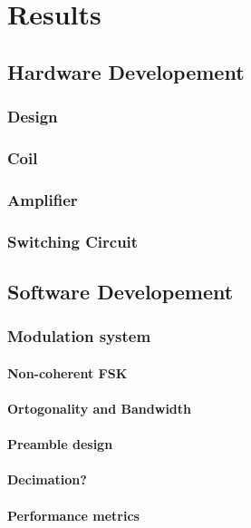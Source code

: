 \chapter{Results}\label{ch:results}

\section{Hardware Developement}

\subsection{Design}
\subsection{Coil}
\subsection{Amplifier}
\subsection{Switching Circuit}

\section{Software Developement}
\subsection{Modulation system}
\subsubsection{Non-coherent FSK}
\subsubsection{Ortogonality and Bandwidth}
\subsubsection{Preamble design}
\subsubsection{Decimation?}
\subsubsection{Performance metrics}

